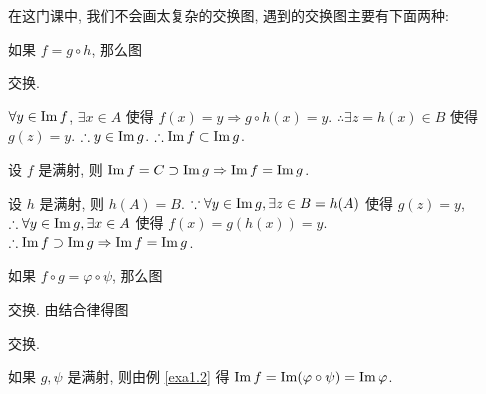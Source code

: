 \documentclass[color=black,device=normal,lang=cn,mode=geye]{elegantnote}
\begin{document}
在这门课中, 我们不会画太复杂的交换图, 遇到的交换图主要有下面两种:
\begin{example}\label{exa1.2}
    如果 $f=g\circ h$, 那么图
    \begin{center}
    \end{center}
    交换.

    $\forall y\in\operatorname{Im} f$, $\exists x\in A$ 使得 $f(x)=y\Rightarrow g\circ h(x)=y$. $\therefore\exists z=h(x)\in B$ 使得 $g(z)=y$. $\therefore y\in\operatorname{Im} g$. $\therefore\operatorname{Im} f\subset\operatorname{Im} g$.

    设 $f$ 是满射, 则 $\operatorname{Im} f=C\supset\operatorname{Im} g\Rightarrow\operatorname{Im} f=\operatorname{Im} g$.
    
    设 $h$ 是满射, 则 $h(A)=B$. $\because\forall y\in\operatorname{Im} g,\exists z\in B=h(A)$ 使得 $g(z)=y$, $\therefore\forall y\in\operatorname{Im} g,\exists x\in A$ 使得 $f(x)=g(h(x))=y$. $\therefore\operatorname{Im} f\supset\operatorname{Im} g\Rightarrow\operatorname{Im} f=\operatorname{Im} g$.
\end{example}
\begin{example}
    如果 $f\circ g=\varphi\circ\psi$, 那么图
    \begin{center}
    \end{center}
    交换. 由结合律得图
    \begin{center}
    \end{center}
    交换.

    如果 $g,\psi$ 是满射, 则由例 \ref{exa1.2} 得 $\operatorname{Im} f=\operatorname{Im}(\varphi\circ\psi)=\operatorname{Im}\varphi$.
\end{example}
\end{document}
